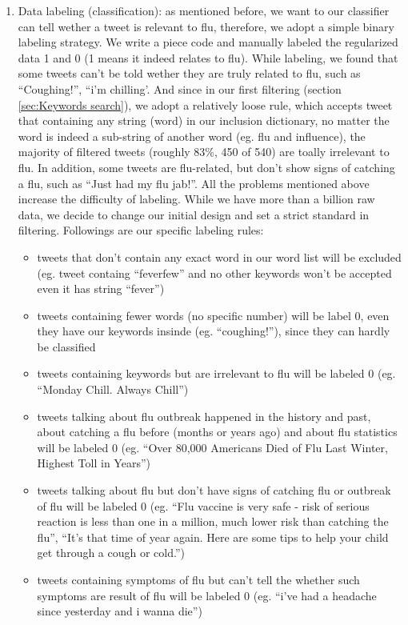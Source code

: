 \begin{enumerate}
    \item Data labeling (classification): as mentioned before, we want to our classifier can tell wether a tweet is relevant to flu, therefore, we adopt a simple binary labeling strategy. We write a piece code and manually labeled the regularized data 1 and 0 (1 means it indeed relates to flu). While labeling, we found that some tweets can't be told wether they are truly related to flu, such as ``Coughing!'', ``i'm chilling'. And since in our first filtering (section \ref{sec:Keywords search}), we adopt a relatively loose rule, which accepts tweet that containing any string (word) in our inclusion dictionary, no matter the word is indeed a sub-string of another word (eg. flu and influence), the majority of filtered tweets (roughly 83\%, 450 of 540) are toally irrelevant to flu. In addition, some tweets are flu-related, but don't show signs of catching a flu, such as ``Just had my flu jab!''. All the problems mentioned above increase the difficulty of labeling. While we have more than a billion raw data, we decide to change our initial design and set a strict standard in filtering. Followings are our specific labeling rules: 
    \begin{itemize}
        \item tweets that don't contain any exact word in our word list will be excluded (eg. tweet containg ``feverfew'' and no other keywords won't be accepted even it has string ``fever'')
        \item tweets containing fewer words (no specific number) will be label 0, even they have our keywords insinde (eg. ``coughing!''), since they can hardly be classified
        \item tweets containing keywords but are irrelevant to flu will be labeled 0 (eg. ``Monday Chill. Always Chill'')
        \item tweets talking about flu outbreak happened in the history and past, about catching a flu before (months or years ago) and about flu statistics will be labeled 0 (eg. ``Over 80,000 Americans Died of Flu Last Winter, Highest Toll in Years'')
        \item tweets talking about flu but don't have signs of catching flu or outbreak of flu will be labeled 0 (eg. ``Flu vaccine is very safe - risk of serious reaction is less than one in a million, much lower risk than catching the flu'', ``It's that time of year again. Here are some tips to help your child get through a cough or cold.'')
        \item tweets containing symptoms of flu but can't tell the whether such symptoms are result of flu will be labeled 0 (eg. ``i’ve had a headache since yesterday and i wanna die'')

\end{itemize}
\end{enumerate}
